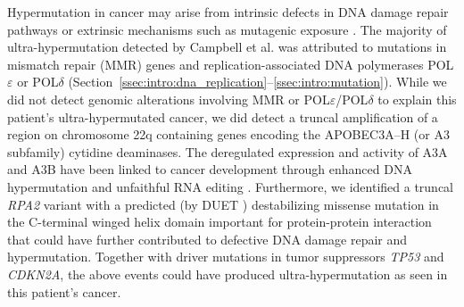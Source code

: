 Hypermutation in cancer may arise from intrinsic defects in DNA damage repair pathways or extrinsic mechanisms such as mutagenic exposure \cite{campbell2017}. The majority of ultra-hypermutation detected by Campbell et al. was attributed to mutations in mismatch repair (MMR) genes and replication-associated DNA polymerases POL$\varepsilon$ or POL$\delta$ (Section~\ref{ssec:intro:dna_replication}--\ref{ssec:intro:mutation}). While we did not detect genomic alterations involving MMR or POL$\varepsilon$\slash{}POL$\delta$ to explain this patient's ultra-hypermutated cancer, we did detect a truncal amplification of a region on chromosome 22q containing genes encoding the APOBEC3A--H (or A3 subfamily) cytidine deaminases. The deregulated expression and activity of A3A and A3B have been linked to cancer development through enhanced DNA hypermutation and unfaithful RNA editing \cite{salter2016,burns2013,henderson2015}. Furthermore, we identified a truncal \textit{RPA2} variant with a predicted (by DUET \cite{pires2014}) destabilizing missense mutation in the C-terminal winged helix domain important for protein-protein interaction that could have further contributed to defective DNA damage repair and hypermutation. Together with driver mutations in tumor suppressors \textit{TP53} and \textit{CDKN2A}, the above events could have produced ultra-hypermutation as seen in this patient's cancer.

